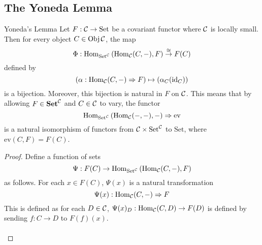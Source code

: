 \documentclass[a4paper]{article}
\begin{document}
\subsection{The Yoneda Lemma}
\begin{thm}{Yoneda's Lemma}{} Let $F:\mathcal{C}\to\text{Set}$ be a covariant functor where $\mathcal{C}$ is locally small. Then for every object $C\in\operatorname{Obj}\mathcal{C}$, the map $$\Phi:\operatorname{Hom}_{\text{Set}^{\mathcal{C}}}\left(\operatorname{Hom}_{\mathcal{C}}(C,-),F\right)\overset{\cong}{\rightarrow}F(C)$$ defined by $$\left(\alpha:\operatorname{Hom}_{\mathcal{C}}(C,-)\Rightarrow F\right)\mapsto\left(\alpha_C(\text{id}_C)\right)$$ is a bijection. Moreover, this bijection is natural in $F$ on $\mathcal{C}$. This means that by allowing $F\in\bold{Set}^{\mathcal{C}}$ and $C\in\mathcal{C}$ to vary, the functor $$\operatorname{Hom}_{\text{Set}^{\mathcal{C}}}\left(\operatorname{Hom}_{\mathcal{C}}(-,-),-\right)\Rightarrow\text{ev}$$ is a natural isomorphism of functors from $\mathcal{C}\times\text{Set}^{\mathcal{C}}$ to $\text{Set}$, where $\text{ev}(C,F)=F(C)$. \tcbline
\begin{proof}
Define a function of sets $$\Psi:F(C)\to\operatorname{Hom}_{\text{Set}^{\mathcal{C}}}\left(\operatorname{Hom}_{\mathcal{C}}(C,-),F\right)$$ as follows. For each $x\in F(C)$, $\Psi(x)$ is a natural transformation $$\Psi(x):\operatorname{Hom}_{\mathcal{C}}(C,-)\Rightarrow F$$ This is defined as for each $D\in\mathcal{C}$, $\Psi(x)_D:\operatorname{Hom}_{\mathcal{C}}(C,D)\to F(D)$ is defined by sending $f:C\to D$ to $F(f)(x)$. \\~\\


\end{proof}
\end{thm}
\end{document}

